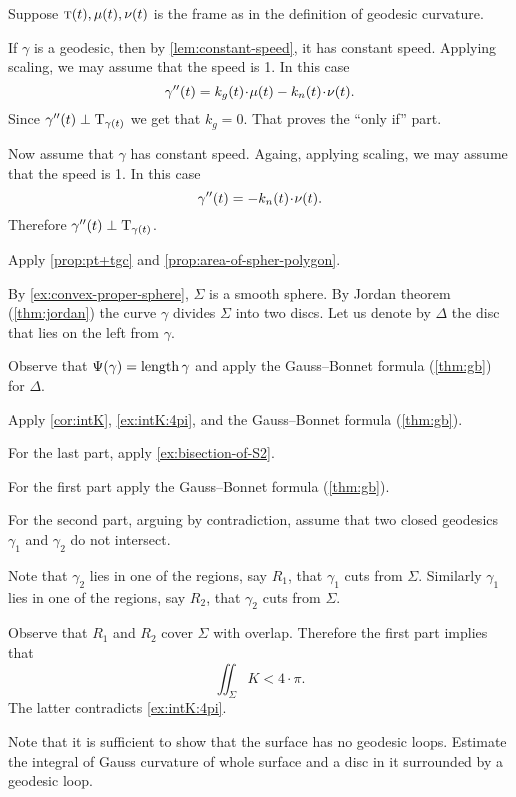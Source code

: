 Suppose $\textsc{t}(t),\mu(t),\nu(t)$ is the frame as in the definition of geodesic curvature.

If $\gamma$ is a geodesic, then by \ref{lem:constant-speed}, it has constant speed.
Applying scaling, we may assume that the speed is 1.
In this case 
\[\gamma''(t)=k_g(t)\cdot \mu(t)-k_n(t)\cdot \Norm(t).\]
Since $\gamma''(t)\perp\mathrm{T}_{\gamma(t)}$ we get that $k_g=0$. 
That proves the ``only if'' part.

Now assume that $\gamma$ has constant speed.
Againg, applying scaling, we may assume that the speed is 1.
In this case 
\[\gamma''(t)=-k_n(t)\cdot \Norm(t).\]
Therefore $\gamma''(t)\perp\mathrm{T}_{\gamma(t)}$.

Apply \ref{prop:pt+tgc} and \ref{prop:area-of-spher-polygon}.

By \ref{ex:convex-proper-sphere}, $\Sigma$ is a smooth sphere.
By Jordan theorem (\ref{thm:jordan}) the curve $\gamma$ divides $\Sigma$  into two discs.
Let us denote by $\Delta$ the disc that lies on the left from $\gamma$.

Observe that $\Psi({\gamma})=\mathop{\rm length}\nolimits\gamma$ and apply  the Gauss--Bonnet formula (\ref{thm:gb}) for $\Delta$.

Apply \ref{cor:intK}, \ref{ex:intK:4pi}, and the Gauss--Bonnet formula (\ref{thm:gb}).

For the last part, apply \ref{ex:bisection-of-S2}.

 For the first part apply the Gauss--Bonnet formula (\ref{thm:gb}).

For the second part, arguing by contradiction, assume that two closed geodesics $\gamma_1$ and $\gamma_2$ do not intersect.

Note that $\gamma_2$ lies in one of the regions, say $R_1$, that $\gamma_1$ cuts  from $\Sigma$.
Similarly $\gamma_1$ lies in one of the regions, say $R_2$, that $\gamma_2$ cuts  from $\Sigma$.

Observe that $R_1$ and $R_2$ cover $\Sigma$ with overlap.
Therefore the first part implies that 
\[\iint_\Sigma K< 4\cdot\pi.\]
The latter contradicts \ref{ex:intK:4pi}.

 Note that it is sufficient to show that the surface has no geodesic loops.
Estimate the integral of Gauss curvature of whole surface and a disc in it surrounded by a geodesic loop.

